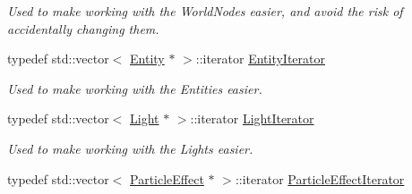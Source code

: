 \begin{DoxyCompactItemize}
\begin{DoxyCompactList}\small\item\em Used to make working with the WorldNodes easier, and avoid the risk of accidentally changing them. \item\end{DoxyCompactList}\item 
\hypertarget{classMezzanine_1_1SceneManager_a870dd323419dc7efe957cacc19a1391c}{
typedef std::vector$<$ \hyperlink{classMezzanine_1_1Entity}{Entity} $\ast$ $>$::iterator \hyperlink{classMezzanine_1_1SceneManager_a870dd323419dc7efe957cacc19a1391c}{EntityIterator}}
\label{classMezzanine_1_1SceneManager_a870dd323419dc7efe957cacc19a1391c}

\begin{DoxyCompactList}\small\item\em Used to make working with the Entities easier. \item\end{DoxyCompactList}\item 
\hypertarget{classMezzanine_1_1SceneManager_a5c5a83086e8b63d21bcfcf38b0888101}{
typedef std::vector$<$ \hyperlink{classMezzanine_1_1Light}{Light} $\ast$ $>$::iterator \hyperlink{classMezzanine_1_1SceneManager_a5c5a83086e8b63d21bcfcf38b0888101}{LightIterator}}
\label{classMezzanine_1_1SceneManager_a5c5a83086e8b63d21bcfcf38b0888101}

\begin{DoxyCompactList}\small\item\em Used to make working with the Lights easier. \item\end{DoxyCompactList}\item 
\hypertarget{classMezzanine_1_1SceneManager_a68a1a1ddc03cee28204759224405d40c}{
typedef std::vector$<$ \hyperlink{classMezzanine_1_1ParticleEffect}{ParticleEffect} $\ast$ $>$::iterator \hyperlink{classMezzanine_1_1SceneManager_a68a1a1ddc03cee28204759224405d40c}{ParticleEffectIterator}}
\label{classMezzanine_1_1SceneManager_a68a1a1ddc03cee28204759224405d40c}


\end{DoxyCompactItemize}
